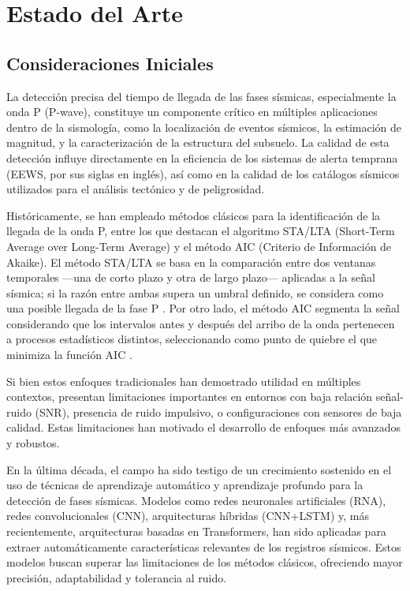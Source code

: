 \chapter{Estado del Arte}\label{background}

\section{Consideraciones Iniciales}

La detección precisa del tiempo de llegada de las fases sísmicas, especialmente la onda P (P-wave), constituye un componente crítico en múltiples aplicaciones dentro de la sismología, como la localización de eventos sísmicos, la estimación de magnitud, y la caracterización de la estructura del subsuelo. La calidad de esta detección influye directamente en la eficiencia de los sistemas de alerta temprana (EEWS, por sus siglas en inglés), así como en la calidad de los catálogos sísmicos utilizados para el análisis tectónico y de peligrosidad.

Históricamente, se han empleado métodos clásicos para la identificación de la llegada de la onda P, entre los que destacan el algoritmo STA/LTA (Short-Term Average over Long-Term Average) y el método AIC (Criterio de Información de Akaike). El método STA/LTA se basa en la comparación entre dos ventanas temporales —una de corto plazo y otra de largo plazo— aplicadas a la señal sísmica; si la razón entre ambas supera un umbral definido, se considera como una posible llegada de la fase P \cite{zhang2020first} \cite{kalkan2016automatic}. Por otro lado, el método AIC segmenta la señal considerando que los intervalos antes y después del arribo de la onda pertenecen a procesos estadísticos distintos, seleccionando como punto de quiebre el que minimiza la función AIC \cite{shang2018enhancing}.

Si bien estos enfoques tradicionales han demostrado utilidad en múltiples contextos, presentan limitaciones importantes en entornos con baja relación señal-ruido (SNR), presencia de ruido impulsivo, o configuraciones con sensores de baja calidad. Estas limitaciones han motivado el desarrollo de enfoques más avanzados y robustos.

En la última década, el campo ha sido testigo de un crecimiento sostenido en el uso de técnicas de aprendizaje automático y aprendizaje profundo para la detección de fases sísmicas. Modelos como redes neuronales artificiales (RNA), redes convolucionales (CNN), arquitecturas híbridas (CNN+LSTM) y, más recientemente, arquitecturas basadas en Transformers, han sido aplicadas para extraer automáticamente características relevantes de los registros sísmicos. Estos modelos buscan superar las limitaciones de los métodos clásicos, ofreciendo mayor precisión, adaptabilidad y tolerancia al ruido.

